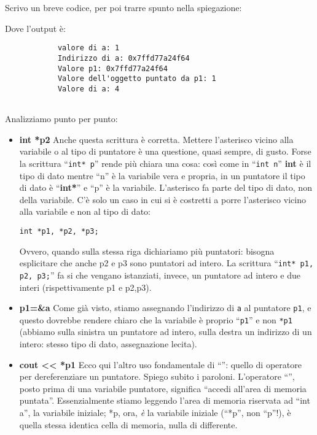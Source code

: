 	Scrivo un breve codice, per poi trarre spunto nella spiegazione:
	

	Dove l'output è:
	\begin{shaded}
		\begin{verbatim}
			valore di a: 1
			Indirizzo di a: 0x7ffd77a24f64
			Valore p1: 0x7ffd77a24f64
			Valore dell'oggetto puntato da p1: 1
			Valore di a: 4
			
		\end{verbatim}
	\end{shaded}

	Analizziamo punto per punto:
	\begin{itemize}
		\item \textbf{int *p2} Anche questa scrittura è corretta. Mettere l'asterisco vicino alla variabile o al tipo di puntatore è una questione, quasi sempre, di gusto. Forse la scrittura ``\lstinline|int* p|'' rende più chiara una cosa: così come in ``\lstinline|int n|'' \textbf{int} è il tipo di dato mentre ``n'' è la variabile vera e propria, in un puntatore il tipo di dato è ``\textbf{int*}'' e ``p'' è la variabile. L'asterisco fa parte del tipo di dato, non della variabile. C'è solo un caso in cui si è costretti a porre l'asterisco vicino alla variabile e non al tipo di dato:
		
		\quad \lstinline|int *p1, *p2, *p3;|
		
		Ovvero, quando sulla stessa riga dichiariamo più puntatori: bisogna esplicitare che anche p2 e p3 sono puntatori ad intero. La scrittura ``\lstinline|int* p1, p2, p3;|'' fa si che vengano istanziati, invece, un puntatore ad intero e due interi (rispettivamente p1 e p2,p3).
		
		\item \textbf{p1=\&a} Come già visto, stiamo assegnando l'indirizzo di \verb|a| al puntatore \verb|p1|, e questo dovrebbe rendere chiaro che la variabile è proprio ``\verb|p1|'' e non \verb|*p1| (abbiamo sulla sinistra un puntatore ad intero, sulla destra un indirizzo di un intero: stesso tipo di dato, assegnazione lecita).
		
		\item \textbf{cout << *p1} Ecco qui l'altro uso fondamentale di ``\textasteriskcentered'': quello di operatore per dereferenziare un puntatore. Spiego subito i paroloni. L'operatore ``\textasteriskcentered'', posto prima di una variabile puntatore, significa ``accedi all'area di memoria puntata''. Essenzialmente stiamo leggendo l'area di memoria riservata ad ``int a'', la variabile iniziale; *p, ora, \emph{è} la variabile iniziale (``*p'', non ``p''!), è quella stessa identica cella di memoria, nulla di differente. 
		

\end{itemize}
